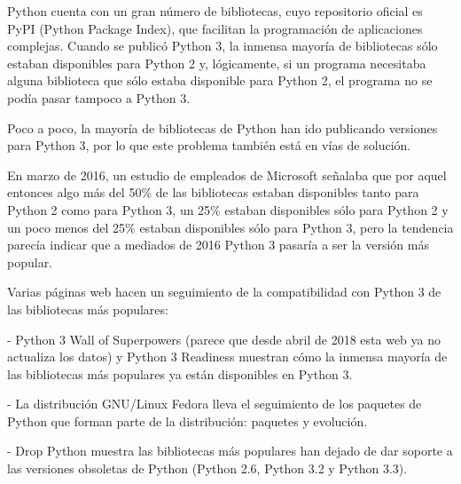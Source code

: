 Python cuenta con un gran número de bibliotecas, cuyo repositorio oficial es PyPI (Python Package Index), que facilitan la programación de aplicaciones complejas. Cuando se publicó Python 3, la inmensa mayoría de bibliotecas sólo estaban disponibles para Python 2 y, lógicamente, si un programa necesitaba alguna biblioteca que sólo estaba disponible para Python 2, el programa no se podía pasar tampoco a Python 3.

Poco a poco, la mayoría de bibliotecas de Python han ido publicando versiones para Python 3, por lo que este problema también está en vías de solución.

En marzo de 2016, un estudio de empleados de Microsoft señalaba que por aquel entonces algo más del 50\% de las bibliotecas estaban disponibles tanto para Python 2 como para Python 3, un 25\% estaban disponibles sólo para Python 2 y un poco menos del 25\% estaban disponibles sólo para Python 3, pero la tendencia parecía indicar que a mediados de 2016 Python 3 pasaría a ser la versión más popular.

Varias páginas web hacen un seguimiento de la compatibilidad con Python 3 de las bibliotecas más populares:

- Python 3 Wall of Superpowers (parece que desde abril de 2018 esta web ya no actualiza los datos) y Python 3 Readiness muestran cómo la inmensa mayoría de las bibliotecas más populares ya están disponibles en Python 3.

- La distribución GNU/Linux Fedora lleva el seguimiento de los paquetes de Python que forman parte de la distribución: paquetes y evolución.

- Drop Python muestra las bibliotecas más populares han dejado de dar soporte a las versiones obsoletas de Python (Python 2.6, Python 3.2 y Python 3.3). \cite{BartolomeWebSite}